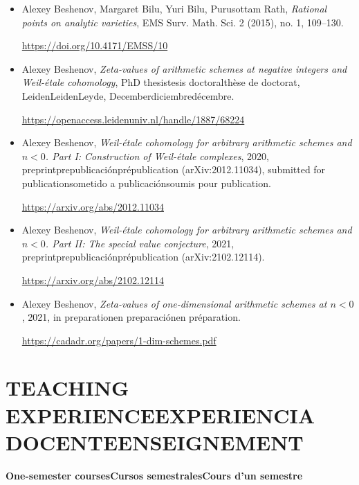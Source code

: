 \documentclass{article}
\newcommand{\biling}[3]{\ifdefined\english#1\fi\ifdefined\spanish#2\fi\ifdefined\french#3\fi}
\begin{document}
\begin{itemize}
\item Alexey Beshenov, Margaret Bilu, Yuri Bilu, Purusottam Rath,
  \emph{Rational points on analytic varieties},
  EMS Surv. Math. Sci. 2 (2015), no. 1, 109–130.

  \url{https://doi.org/10.4171/EMSS/10}

\item Alexey Beshenov,
  \emph{Zeta-values of arithmetic schemes at negative integers and Weil-étale cohomology},
  \biling{PhD thesis}{tesis doctoral}{thèse de doctorat}, \biling{Leiden}{Leiden}{Leyde}, \biling{December}{diciembre}{décembre} 2018.

  \url{https://openaccess.leidenuniv.nl/handle/1887/68224}

\item Alexey Beshenov,
  \emph{Weil-étale cohomology for arbitrary arithmetic schemes and $n < 0$.
    Part I: Construction of Weil-étale complexes},
  2020, \biling{preprint}{prepublicación}{prépublication} (arXiv:2012.11034),
  \biling{submitted for publication}{sometido a publicación}{soumis pour publication}.

  \url{https://arxiv.org/abs/2012.11034}

\item Alexey Beshenov,
  \emph{Weil-étale cohomology for arbitrary arithmetic schemes and $n < 0$.
    Part II: The special value conjecture},
  2021, \biling{preprint}{prepublicación}{prépublication} (arXiv:2102.12114).

  \url{https://arxiv.org/abs/2102.12114}

\item Alexey Beshenov,
  \emph{Zeta-values of one-dimensional arithmetic schemes at $n < 0$},
  2021, \biling{in preparation}{en preparación}{en préparation}.

  \url{https://cadadr.org/papers/1-dim-schemes.pdf}
\end{itemize}

\pagebreak

{\color{RoyalBlue}\section*{\biling{TEACHING EXPERIENCE}{EXPERIENCIA DOCENTE}{ENSEIGNEMENT}}}

\noindent\textbf{\biling{One-semester courses}{Cursos semestrales}{Cours d'un semestre}}

\vspace{0.5em}
\end{document}
